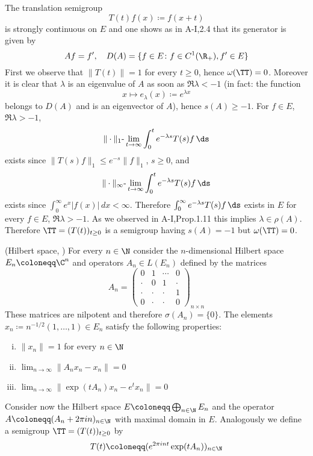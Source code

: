 The translation semigroup
\[
    T(t)f(x) \coloneqq f(x+t)
\]
is strongly continuous on $E$ and one shows as in A-I,2.4 that its generator is given by
\[
    Af = f', \quad D(A) = \{ f \in E \colon f \in C^{1}(\R_{+}), f' \in E \}
\]
First we observe that $\|T(t)\| = 1$ for every $t \geq 0$, hence $\omega(\TT) = 0$.
Moreover it is clear that $\lambda$ is an eigenvalue of $A$ as soon as $\Re\lambda < -1$ (in fact: the function
\[
    x \mapsto e_{\lambda}(x) \coloneqq e^{\lambda x}
\]
belongs to $D(A)$ and is an eigenvector of $A$), hence $s(A) \geq -1$.
For $f \in E$, $\Re\lambda > -1$,
\[
    \|\cdot\|_{1}\text{-}\lim_{t \to \infty} \int_{0}^{t} e^{-\lambda s}T(s)f \, \ds
\]
exists since $\|T(s)f\|_{1} \leq e^{-s}\|f\|_{1}$, $s \geq 0$, and
\[
    \|\cdot\|_{\infty}\text{-}\lim_{t \to \infty} \int_{0}^{t} e^{-\lambda s}T(s)f \, \ds
\]
exists since $\int_{0}^{\infty} e^{x}|f(x)| \, dx < \infty$.
Therefore $\int_{0}^{\infty} e^{-\lambda s}T(s)f \, \ds$ exists in $E$ for every $f \in E$, $\Re\lambda > -1$.
As we observed in A-I,Prop.1.11 this implies $\lambda \in \rho(A)$.
Therefore $\TT = (T(t))_{t\geq 0}$ is a semigroup having $s(A) = -1$ but $\omega(\TT) = 0$.
\begin{example}\label{ex:a3-1.4}
(Hilbert space, \citet{zabczyk:1975})
For every $n \in \N$ consider the $n$-dimensional Hilbert space $E_{n} \coloneqq \C^{n}$ and operators $A_{n} \in L(E_{n})$ defined by the matrices
\[
    A_{n} = 
    \begin{pmatrix}
    0 & 1 & \cdots & 0 \\
    \cdot & 0 & 1 & \cdot \\
    \cdot & \cdot & \cdot & 1 \\
    0 & \cdot & \cdot & 0
    \end{pmatrix}_{n \times n}
\]
These matrices are nilpotent and therefore $\sigma(A_{n}) = \{0\}$.
The elements $x_{n} \coloneqq n^{-1/2}(1, \ldots, 1) \in E_{n}$ satisfy the following properties:

\begin{enumerate}[(i)]
\item 
$\|x_{n}\| = 1$ for every $n \in \N$

\item 
$\lim_{n \to \infty} \|A_{n}x_{n} - x_{n}\| = 0$

\item 
$\lim_{n \to \infty} \|\exp(tA_{n})x_{n} - e^{t}x_{n}\| = 0$

\end{enumerate}
Consider now the Hilbert space $E \coloneqq \bigoplus_{n \in \N} E_{n}$ and the operator $A \coloneqq (A_{n} + 2\pi in)_{n \in \N}$ with maximal domain in $E$.
Analogously we define a semigroup $\TT = (T(t))_{t \geq 0}$ by
\[
    T(t) \coloneqq (e^{2\pi int}\exp(tA_{n}))_{n \in \N}
\]
\end{example}

